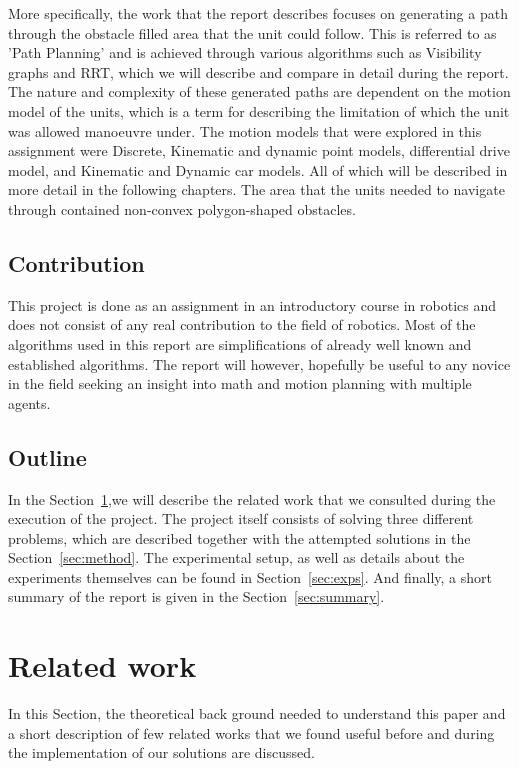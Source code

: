 \documentclass[a4paper,12pt]{article}
\begin{document}
More specifically, the work that the report describes focuses on generating a path through the obstacle filled area that the unit could follow. This is referred to as 'Path Planning' and is achieved through various algorithms such as Visibility graphs and RRT, which we will describe and compare in detail during the report. The nature and complexity of these generated paths are dependent on the motion model of the units, which is a term for describing the limitation of which the unit was allowed manoeuvre under. The motion models that were explored in this assignment were Discrete, Kinematic and dynamic point models, differential drive model, and Kinematic and Dynamic car models. All of which will be described in more detail in the following chapters. The area that the units needed to navigate through contained non-convex polygon-shaped obstacles. 

\subsection{Contribution} 
 This project is done as an assignment in an introductory course in robotics and does not consist of any real contribution to the field of robotics. Most of the algorithms used in this report are simplifications of already well known and established algorithms. 
The report will however, hopefully be useful to any novice in the field seeking an insight into math and motion planning with multiple agents.   

\subsection{Outline}
In the Section~\ref{sec:relwork},we will describe the related work that we consulted during the execution of the project. The project itself consists of solving three different problems, which are described together with the attempted solutions in the Section~\ref{sec:method}. The experimental setup, as well as details about the experiments themselves can be found in Section~\ref{sec:exps}. And finally, a short summary of the report is given in the Section~\ref{sec:summary}.
 


\section{Related work}
\label{sec:relwork}
In this Section, the theoretical back ground needed to understand this paper and a short description of few related works that we found useful before and during the implementation of our solutions are discussed.
\end{document}
